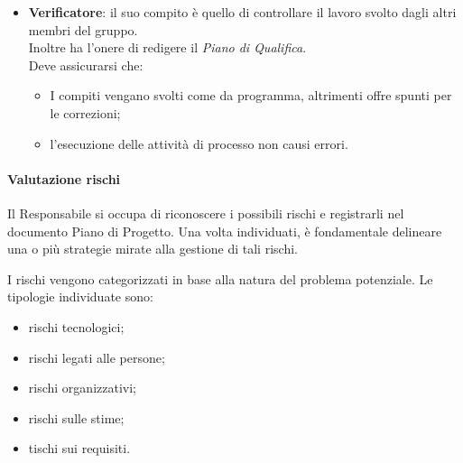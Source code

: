 \begin{itemize}
            \item \textbf{Verificatore}: il suo compito \`e quello di controllare il lavoro svolto dagli altri membri del gruppo. \\
            Inoltre ha l'onere di redigere il \emph{Piano di Qualifica}. \\
            Deve assicurarsi che:
            \begin{itemize}
                \item I compiti vengano svolti come da programma, altrimenti offre spunti per le correzioni;
                \item l'esecuzione delle attivit\`a di processo non causi errori.
            \end{itemize}
        \end{itemize}

        \paragraph{Valutazione rischi}
        Il Responsabile si occupa di riconoscere i possibili rischi e registrarli nel documento Piano di Progetto. Una volta individuati, è fondamentale delineare una o più strategie mirate alla gestione di tali rischi.

        \vspace{0.3cm}
        \noindent
        I rischi vengono categorizzati in base alla natura del problema potenziale. Le tipologie individuate sono:
        \begin{itemize}
            \item rischi tecnologici;
            \item rischi legati alle persone;
            \item rischi organizzativi;
            \item rischi sulle stime;
            \item tischi sui requisiti.
        \end{itemize}

